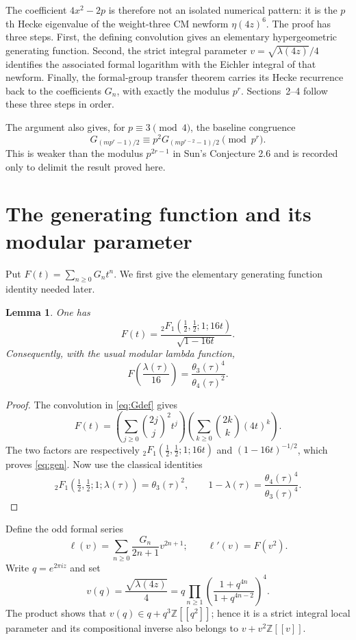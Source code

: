 \documentclass[11pt]{article}
\newtheorem{lemma}[theorem]{Lemma}
\theoremstyle{remark}
\newcommand{\Z}{\mathbb Z}
\begin{document}
The coefficient $4x^2-2p$ is therefore not an isolated numerical pattern:
it is the $p$th Hecke eigenvalue of the weight-three CM newform
$\eta(4z)^6$.  The proof has three steps.  First, the defining convolution
gives an elementary hypergeometric generating function.  Second, the strict
integral parameter $v=\sqrt{\lambda(4z)}/4$ identifies the associated
formal logarithm with the Eichler integral of that newform.  Finally, the
formal-group transfer theorem carries its Hecke recurrence back to the
coefficients $G_n$, with exactly the modulus $p^r$.  Sections~2--4 follow
these three steps in order.

The argument also gives, for $p\equiv3\pmod4$, the baseline congruence
\[
G_{(mp^r-1)/2}\equiv p^2G_{(mp^{r-2}-1)/2}\pmod {p^r}.
\]
This is weaker than the modulus $p^{2r-1}$ in Sun's Conjecture 2.6 and is
recorded only to delimit the result proved here.

\section{The generating function and its modular parameter}

Put $F(t)=\sum_{n\ge0}G_nt^n$.  We first give the elementary generating
function identity needed later.

\begin{lemma}\label{lem:gen}
One has
\begin{equation}\label{eq:gen}
F(t)=\frac{{}_2F_1(\frac12,\frac12;1;16t)}{\sqrt{1-16t}}.
\end{equation}
Consequently, with the usual modular lambda function,
\begin{equation}\label{eq:param}
F\!\left(\frac{\lambda(\tau)}{16}\right)
=\frac{\theta_3(\tau)^4}{\theta_4(\tau)^2}.
\end{equation}
\end{lemma}

\begin{proof}
The convolution in \eqref{eq:Gdef} gives
\[
F(t)=\left(\sum_{j\ge0}\binom{2j}{j}^2t^j\right)
       \left(\sum_{k\ge0}\binom{2k}{k}(4t)^k\right).
\]
The two factors are respectively
${}_2F_1(\frac12,\frac12;1;16t)$ and $(1-16t)^{-1/2}$,
which proves \eqref{eq:gen}.  Now use the classical identities
\[
{}_2F_1\!\left(\tfrac12,\tfrac12;1;\lambda(\tau)\right)
=\theta_3(\tau)^2,
\qquad
1-\lambda(\tau)=\frac{\theta_4(\tau)^4}{\theta_3(\tau)^4}.
\]
\end{proof}

Define the odd formal series
\begin{equation}\label{eq:ell}
\ell(v)=\sum_{n\ge0}\frac{G_n}{2n+1}v^{2n+1};
\qquad \ell'(v)=F(v^2).
\end{equation}
Write $q=e^{2\pi iz}$ and set
\begin{equation}\label{eq:vq}
v(q)=\frac{\sqrt{\lambda(4z)}}4
=q\prod_{n\ge1}\left(\frac{1+q^{4n}}{1+q^{4n-2}}\right)^4.
\end{equation}
The product shows that $v(q)\in q+q^3\Z[[q^2]]$; hence it is a strict
integral local parameter and its compositional inverse also belongs to
$v+v^2\Z[[v]]$.
\end{document}
